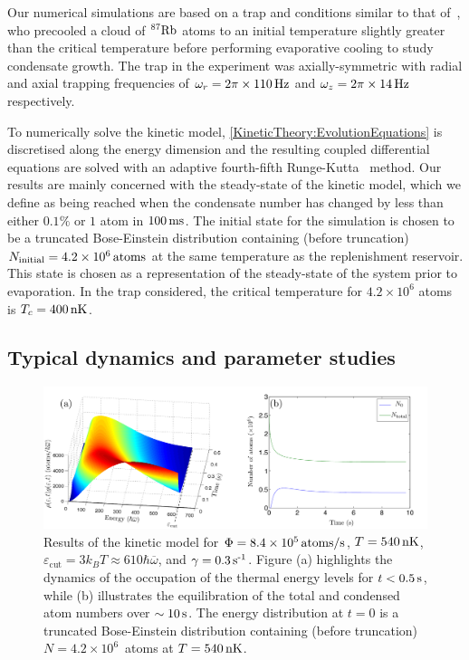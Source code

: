 Our numerical simulations are based on a trap and conditions similar to that of~\citep{Kohl:2002}, who precooled a cloud of $^{87}\text{Rb}$ atoms to an initial temperature slightly greater than the critical temperature before performing evaporative cooling to study condensate growth.  The trap in the experiment was axially-symmetric with radial and axial trapping frequencies of  $\omega_r = \unit[2 \pi \times 110]{Hz}$ and $\omega_z = \unit[2\pi \times 14]{Hz}$ respectively.

To numerically solve the kinetic model, \eqref{KineticTheory:EvolutionEquations} is discretised along the energy dimension and the resulting coupled differential equations are solved with an adaptive fourth-fifth Runge-Kutta~\citep{NumericalRecipes} method. Our results are mainly concerned with the steady-state of the kinetic model, which we define as being reached when the condensate number has changed by less than either $0.1\%$ or $1$ atom in $\unit[100]{ms}$.  The initial state for the simulation is chosen to be a truncated Bose-Einstein distribution containing (before truncation) $N_\text{initial} = \unit[4.2\times 10^6]{atoms}$ at the same temperature as the replenishment reservoir.  This state is chosen as a representation of the steady-state of the system prior to evaporation.  In the trap considered, the critical temperature for $4.2\times 10^6$ atoms is $T_c = \unit[400]{nK}$.


\subsection{Typical dynamics and parameter studies}
\label{KineticTheory:ParameterStudies}

\begin{figure}
    \centering
    \includegraphics[width=15cm]{EnergyDistributionFunctionEvolution}
    \caption{Results of the kinetic model for $\Phi = \unit[8.4 \times 10^5]{atoms/s}$, $T=\unit[540]{nK}$, $\varepsilon_\text{cut} = 3 k_B T \approx 610 \hbar \overline{\omega}$, and $\gamma = \unit[0.3]{s\textsuperscript{-1}}$. Figure (a) highlights the dynamics of the occupation of the thermal energy levels for $t < \unit[0.5]{s}$, while (b) illustrates the equilibration of the total and condensed atom numbers over $\sim \unit[10]{s}$. The energy distribution at $t=0$ is a truncated Bose-Einstein distribution containing (before truncation) $N=4.2\times 10^6$~atoms at $T=\unit[540]{nK}$.
    }
    \label{KineticTheory:EnergyDistributionFunctionEvolution}
\end{figure}

